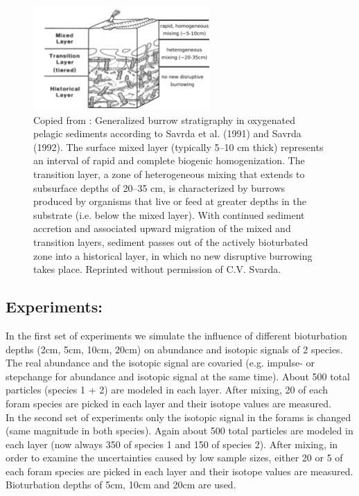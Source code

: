 \documentclass[a4paper,oneside,9pt]{article}
\begin{document}
\begin{figure}[hbp]
\begin{center}
	\includegraphics[width=0.6\textwidth]{../figures/Sediment_column.pdf}
	\caption{Copied from \citet{trauth_turbo2:_2013}: Generalized burrow stratigraphy in oxygenated pelagic sediments according
to Savrda et al. (1991) and Savrda (1992). The surface mixed layer (typically 5--10 cm thick) represents an interval of rapid and complete biogenic homogenization.
The transition layer, a zone of heterogeneous mixing that extends to subsurface depths of 20--35 cm, is characterized by burrows produced by organisms that live or
feed at greater depths in the substrate (i.e. below the mixed layer). With continued sediment accretion and associated upward migration of the mixed and transition
layers, sediment passes out of the actively bioturbated zone into a historical layer, in which no new disruptive burrowing takes place. Reprinted without permission of C.V. Svarda.
}\label{fig:TURBO2_schematic}
\end{center}
\end{figure}

\subsection{Experiments:}
In the first set of experiments we simulate the influence of different bioturbation depths (2cm, 5cm, 10cm, 20cm) on abundance and isotopic signals of 2 species. The 
real abundance and the isotopic signal are covaried (e.g. impulse- or stepchange for abundance and isotopic signal at the same time). About 500 total particles (species 1 + 2) are modeled in each layer. 
After mixing, 20 of each foram species are picked in each layer and their isotope values are measured.\\

In the second set of experiments only the isotopic signal in the forams is changed (same magnitude in both species). Again about 500 total particles are modeled in each layer (now always 350 of species 1 and 150 of species 2). 
After mixing, in order to examine the uncertainties caused by low sample sizes, either 20 or 5 of each foram species are picked in each layer and their isotope values are measured.
Bioturbation depths of 5cm, 10cm and 20cm are used. 
\end{document}
